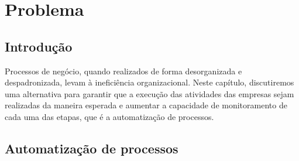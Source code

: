 \chapter{Problema}\label{chp:problema}

\section{Introdução}\label{sec:problema-introducao}
Processos de negócio, quando realizados de forma desorganizada e despadronizada, levam à ineficiência organizacional. Neste capítulo, discutiremos uma alternativa para garantir que a execução das atividades das empresas sejam realizadas da maneira esperada e aumentar a capacidade de monitoramento de cada uma das etapas, que é a automatização de processos. 

\section{Automatização de processos}\label{sec:problema-automatizacao_processos}



